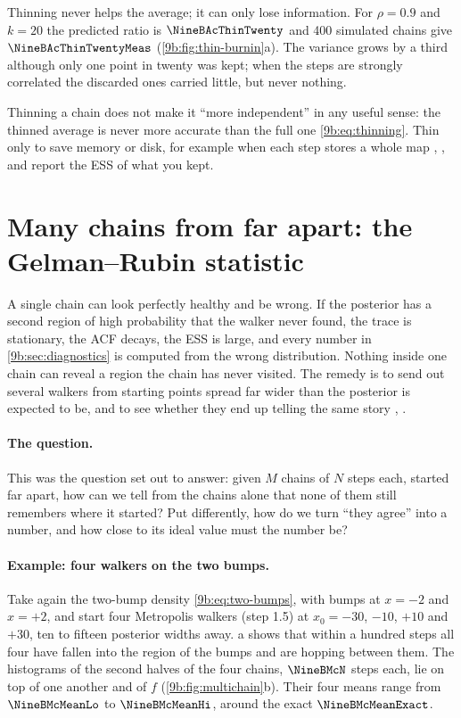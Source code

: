 Thinning never helps the average; it can only lose information. For $\rho=0.9$ and $k=20$ the
predicted ratio is $\NineBAcThinTwenty$ and 400 simulated chains give $\NineBAcThinTwentyMeas$
(\cref{9b:fig:thin-burnin}a). The variance grows by a third although only one point in twenty
was kept; when the steps are strongly correlated the discarded ones carried little, but never
nothing.

\begin{pitfall}
Thinning a chain does not make it ``more independent'' in any useful sense: the thinned average
is never more accurate than the full one \eqref{9b:eq:thinning}. Thin only to save memory or
disk, for example when each step stores a whole map ,
, and report the ESS of what you kept.
\end{pitfall}
\section{Many chains from far apart: the Gelman--Rubin statistic}
\label{9b:sec:rhat}

A single chain can look perfectly healthy and be wrong. If the posterior has a second region of
high probability that the walker never found, the trace is stationary, the ACF decays, the ESS is
large, and every number in \cref{9b:sec:diagnostics} is computed from the wrong distribution.
Nothing inside one chain can reveal a region the chain has never visited. The remedy is to send
out several walkers from starting points spread far wider than the posterior is expected to be,
and to see whether they end up telling the same story ,
.

\paragraph{The question.} This was the question \textcite{GelmanRubin1992} set out to answer:
given $M$ chains of $N$ steps each, started far apart, how can we tell from the chains alone that
none of them still remembers where it started? Put differently, how do we turn ``they agree''
into a number, and how close to its ideal value must the number be?

\paragraph{Example: four walkers on the two bumps.}
Take again the two-bump density \eqref{9b:eq:two-bumps}, with bumps at $x=-2$ and $x=+2$, and
start four Metropolis walkers (step 1.5) at $x_0=-30$, $-10$, $+10$ and $+30$, ten to fifteen
posterior widths away. a shows that within a hundred steps all four have
fallen into the region of the bumps and are hopping between them. The histograms of the second
halves of the four chains, $\NineBMcN$ steps each, lie on top of one another and of $f$
(\cref{9b:fig:multichain}b). Their four means range from $\NineBMcMeanLo$ to $\NineBMcMeanHi$,
around the exact $\NineBMcMeanExact$.

